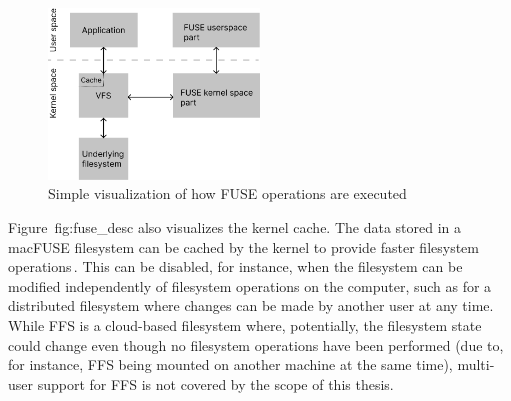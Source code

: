 \begin{figure}[!ht]
	\begin{center}
	  \includegraphics[width=0.5\textwidth]{figures/fuse_description.png}
	\end{center}
	\caption{Simple visualization of how \gls{FUSE} operations are executed}
	\label{fig:fuse_desc}
\end{figure}

Figure~{fig:fuse_desc} also visualizes the kernel cache. The data stored in a macFUSE filesystem can be cached by the kernel to provide faster filesystem operations\,\cite{vangoorFUSENotFUSE2017, MountOptionsOsxfuse, gowdappaExperiencesFUSEReal2019}. This can be disabled, for instance, when the filesystem can be modified independently of filesystem operations on the computer, such as for a distributed filesystem where changes can be made by another user at any time. While \gls{FFS} is a \mbox{cloud-based} filesystem where, potentially, the filesystem state could change even though no filesystem operations have been performed (due to, for instance, \gls{FFS} being mounted on another machine at the same time), multi-user support for \gls{FFS} is not covered by the scope of this thesis.